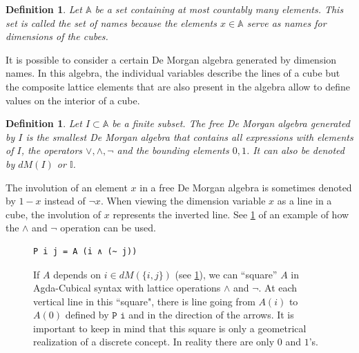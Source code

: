 \documentclass[11pt,a4paper,twoside,xetex,draft]{book}
\newcommand{\keyword}[1]{\emph{#1}\index{#1}}
\newtheorem{definition}[theorem]{Definition}
\begin{document}
\begin{definition}
Let $\mathbb{A}$ be a set containing at most countably many elements. This set is called the \keyword{set of names} because the elements $x \in \mathbb{A}$ serve as names for dimensions of the cubes. 
\end{definition}

It is possible to consider a certain De Morgan algebra generated by dimension names. In this algebra, the individual variables describe the lines of a cube but the composite lattice elements that are also present in the algebra allow to define values on the interior of a cube.


\begin{definition}\label{freedm}
Let $I \subset \mathbb{A}$ be a finite subset. The \keyword{free De Morgan algebra} generated by $I$ is the smallest De Morgan algebra that contains all expressions with elements of $I$, the operators $\vee, \wedge, \neg$ and  the bounding elements $0, 1$. It can also be denoted by $dM(I)$ or $\mathbb{I}$.
\end{definition}

The involution of an element $x$ in a free De Morgan algebra is sometimes denoted by $1- x$ instead  of $\neg x$. When viewing the dimension variable $x$ as a line in a cube, the involution of $x$ represents the inverted line. See \cref{zeroPath} of an example of how the $\wedge $ and $\neg$ operation can be used.

\begin{figure}\label{zeroPath}
 \centering
\begin{BVerbatim}
P i j = A (i ∧ (~ j))
\end{BVerbatim} 





 

 
 
 \caption{If $A$ depends on $i \in dM(\{i,j\})$ (see \cref{freedm}), we can ``square'' $A$ in Agda-Cubical syntax \cite{Moertberg2018} with lattice operations $\wedge$ and $\neg$. At each vertical line in this ``square", there is line going from $A(i)$ to $A(0)$ defined by $\texttt{P i}$ and in the direction of the arrows. It is important to keep in mind that this square is only a geometrical realization of a discrete concept. In reality there are only $0$ and $1$'s. }
\end{figure}
\end{document}
